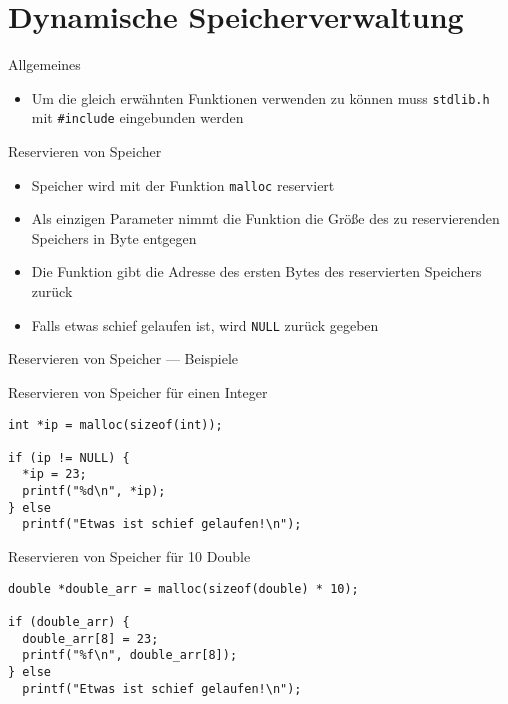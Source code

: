 \documentclass[presentation]{beamer}
\begin{document}
\section{Dynamische Speicherverwaltung}
\label{sec:org2413e0d}
\begin{frame}[label={sec:org404f39e},fragile]{Allgemeines}
 \begin{itemize}
\item Um die gleich erwähnten Funktionen verwenden zu können muss
{\color{solarizedYellow}\verb!stdlib.h!} mit {\color{solarizedYellow}\verb!#include!} eingebunden werden
\end{itemize}
\end{frame}
\begin{frame}[label={sec:org7b37426},fragile]{Reservieren von Speicher}
 \begin{itemize}
\item Speicher wird mit der Funktion {\color{solarizedYellow}\verb!malloc!} reserviert
\item Als einzigen Parameter nimmt die Funktion die Größe des zu
reservierenden Speichers in Byte entgegen
\item Die Funktion gibt die Adresse des ersten Bytes des reservierten
Speichers zurück
\item Falls etwas schief gelaufen ist, wird {\color{solarizedYellow}\verb!NULL!} zurück gegeben
\end{itemize}
\end{frame}
\begin{frame}[label={sec:org9255081},fragile]{Reservieren von Speicher --- Beispiele}
 \begin{block}{Reservieren von Speicher für einen Integer}
\begin{verbatim}
int *ip = malloc(sizeof(int));

if (ip != NULL) {
  *ip = 23;
  printf("%d\n", *ip);
} else
  printf("Etwas ist schief gelaufen!\n");
\end{verbatim}
\end{block}
\begin{block}{Reservieren von Speicher für 10 Double}
\begin{verbatim}
double *double_arr = malloc(sizeof(double) * 10);

if (double_arr) {
  double_arr[8] = 23;
  printf("%f\n", double_arr[8]);
} else
  printf("Etwas ist schief gelaufen!\n");
\end{verbatim}
\end{block}
\end{frame}
\end{document}
